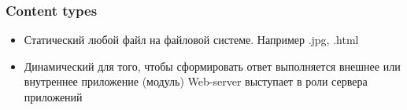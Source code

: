 \begin{frame}[fragile]
        \frametitle{Content types}

\begin{itemize}
    \item \alert{Статический} любой файл на файловой системе. Например .jpg, .html
    \item \alert{Динамический} для того, чтобы сформировать ответ выполняется внешнее или внутреннее приложение (модуль) Web-server выступает в роли сервера приложений
\end{itemize}

\end{frame}
